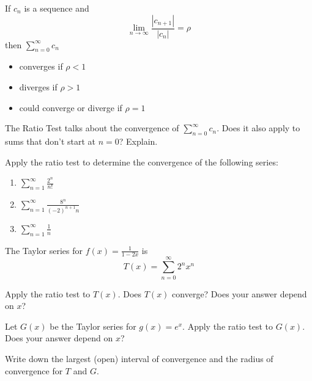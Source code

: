 \documentclass{workbook}
\begin{document}
\begin{slide}
	\question
	\begin{theorem}
		If $c_n$ is a sequence and
		\[
			\lim_{n\to\infty} \frac{|c_{n+1}|}{|c_n|} =\rho
		\]
		then $\displaystyle \sum_{n=0}^\infty c_n$ 

		\begin{itemize}
			\item converges if $\rho < 1$
			\item diverges if $\rho > 1$
			\item could converge or diverge if $\rho =1$
		\end{itemize}
	\end{theorem}

	\begin{parts}
		\item 
		\begin{minipage}[t]{0.45\textwidth}
		The Ratio Test talks about the convergence of $\displaystyle \sum_{n=0}^\infty c_n$.
		Does it also apply to sums that don't start at $n=0$? Explain.
		\end{minipage}
		\item Apply the ratio test to determine the convergence of the 
		following series:
		\begin{enumerate}
			\item $\displaystyle \sum_{n=1}^\infty \frac{2^{n}}{n!}$
			\item $\displaystyle \sum_{n=1}^\infty \frac{8^n}{(-2)^{n+1}n}$
			\item $\displaystyle \sum_{n=1}^\infty \frac{1}{n}$
		\end{enumerate}
	\end{parts}
\end{slide}

\begin{slide}
	\question
	The Taylor series for $f(x)=\frac{1}{1-2x}$ is
	\[
		T(x)=\sum_{n=0}^\infty 2^nx^n
	\]

	\begin{parts}
		\item Apply the ratio test to $T(x)$. Does $T(x)$ converge?
		Does your answer depend on $x$?
		\item Let $G(x)$ be the Taylor series for $g(x)=e^x$. Apply the ratio
		test to $G(x)$. Does your answer depend on $x$?
		\item Write down the largest (open) interval of convergence and the radius of convergence for $T$ and $G$.
	\end{parts}
\end{slide}
\end{document}

